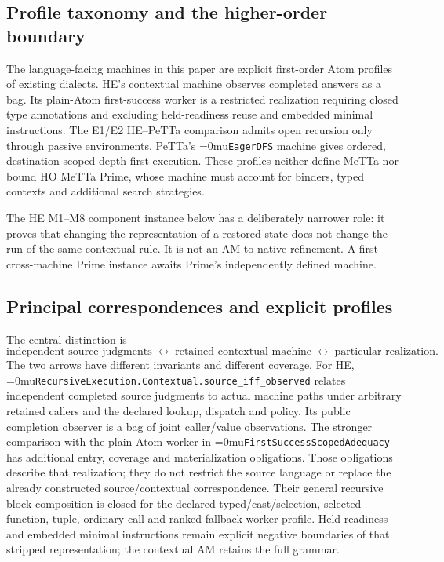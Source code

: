 \documentclass[11pt,a4paper]{article}
\newcommand{\name}[1]{\textup{\Urlmuskip=0mu\relax\nolinkurl{#1}}}
\begin{document}
\subsection*{Profile taxonomy and the higher-order boundary}

The language-facing machines in this paper are explicit first-order Atom
profiles of existing dialects. HE's contextual machine observes completed
answers as a bag. Its plain-Atom first-success worker is a restricted
realization requiring closed type annotations and excluding held-readiness
reuse and embedded minimal instructions. The E1/E2 HE--PeTTa comparison admits
open recursion only through passive environments. PeTTa's \name{EagerDFS}
machine gives ordered, destination-scoped depth-first execution. These profiles
neither define MeTTa nor bound HO MeTTa Prime, whose machine must account for
binders, typed contexts and additional search strategies.

The HE M1--M8 component instance below has a deliberately narrower role: it
proves that changing the representation of a restored state does not change
the run of the same contextual rule. It is not an AM-to-native refinement. A
first cross-machine Prime instance awaits Prime's independently defined
machine.

\subsection*{Principal correspondences and explicit profiles}

The central distinction is
\[
 \text{independent source judgments}
 \;\longleftrightarrow\;
 \text{retained contextual machine}
 \;\longleftrightarrow\;
 \text{particular realization}.
\]
The two arrows have different invariants and different coverage. For HE,
\name{RecursiveExecution.Contextual.source_iff_observed} relates independent
completed source judgments to actual machine paths under arbitrary retained
callers and the declared lookup, dispatch and policy. Its public completion
observer is a bag of joint caller/value observations. The stronger comparison
with the plain-Atom worker in \name{FirstSuccessScopedAdequacy} has additional
entry, coverage and materialization obligations. Those obligations describe
that realization; they do not restrict the source language or replace the
already constructed source/contextual correspondence. Their general recursive
block composition is closed for the declared typed/cast/selection,
selected-function, tuple, ordinary-call and ranked-fallback worker profile.
Held readiness and embedded minimal instructions remain explicit negative
boundaries of that stripped representation; the contextual AM retains the full
grammar.
\end{document}
